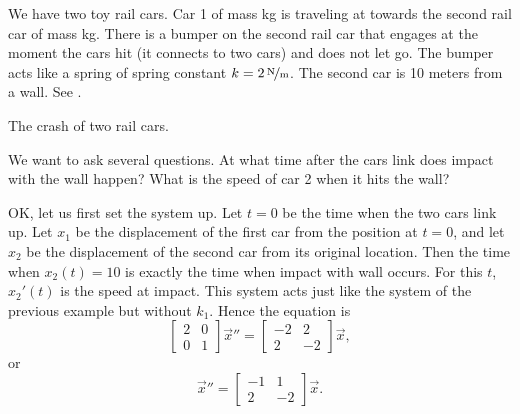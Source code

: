 \begin{example} \label{sosa:railcarexample}
We have two toy rail
cars.  Car 1 of mass \unit[2]{kg} is traveling at 
towards the second
rail car of mass \unit[1]{kg}.  There is a bumper on the second rail car that
engages at the moment the cars hit (it connects to two cars)
and does not let go.
The bumper acts like a spring of spring constant $k=\unitfrac[2]{N}{m}$.
The second
car is 10 meters from a wall.  See .

\begin{myfig}
\capstart
{}
\caption{The crash of two rail cars.\label{sosa:railcarscrashfig}}
\end{myfig}

We want to ask several questions.  At what time after the cars link does
impact with the wall happen?  What is the speed of car 2 when it hits the
wall?

OK\@, let us first set the system up.  Let $t=0$ be the time
when the two cars link up.  Let $x_1$ be the displacement of the first car
from the position at $t=0$, and let $x_2$ be the
displacement of the second car from its original location.  Then the
time when $x_2(t) = 10$ is exactly the time when impact with wall occurs.
For this $t$, $x_2'(t)$ is the speed at impact.  This system acts just like the
system of the previous example but without $k_1$.  Hence the equation is
\begin{equation*}
\begin{bmatrix}
2 & 0 \\
0 & 1
\end{bmatrix}
{\vec{x}}'' =
\begin{bmatrix}
-2 & 2 \\
2 & -2
\end{bmatrix}
\vec{x} ,
\end{equation*}
or
\begin{equation*}
{\vec{x}}'' =
\begin{bmatrix}
-1 & 1 \\
2 & -2
\end{bmatrix}
\vec{x} .
\end{equation*}


\end{example}
